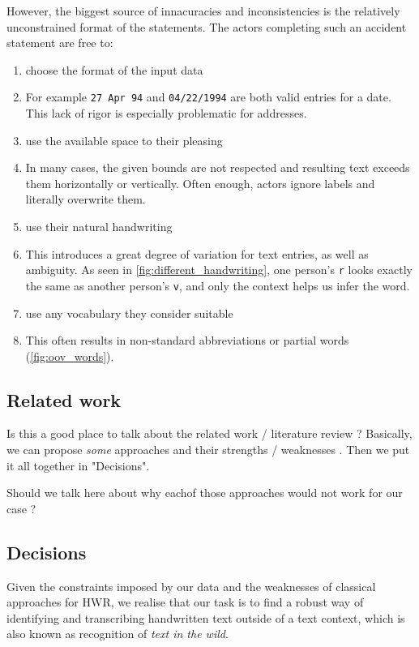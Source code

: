 However, the biggest source of innacuracies and inconsistencies is the relatively unconstrained format of the statements. The actors completing such an accident statement are free to:
\begin{enumerate}
	\item choose the format of the input data
	\item[] For example \texttt{27 Apr 94} and \texttt{04/22/1994} are both valid entries for a date. This lack of rigor is especially problematic for addresses.

	\item use the available space to their pleasing
	\item[] In many cases, the given bounds are not respected and resulting text exceeds them horizontally or vertically. Often enough, actors ignore labels and literally overwrite them.

	\item{use their natural handwriting \label{itm:natural_handwriting}}
	\item[] This introduces a great degree of variation for text entries, as well as ambiguity. As seen in \cref{fig:different_handwriting}, one person's \texttt{r} looks exactly the same as another person's \texttt{v}, and only the context helps us infer the word.

	\item use any vocabulary they consider suitable
	\item[] This often results in non-standard abbreviations or partial words (\cref{fig:oov_words}).
\end{enumerate}

\subsection{Related work}
Is this a good place to talk about the related work / literature review ? Basically, we can propose \emph{some} approaches and their strengths / weaknesses . Then we put it all together in "Decisions".

Should we talk here about why eachof those approaches would not work for our case ?

\subsection{Decisions}
Given the constraints imposed by our data and the weaknesses of classical approaches for HWR, we realise that our task is to find a robust way of identifying and transcribing handwritten text outside of a text context, which is also known as recognition of \emph{text in the wild}.





